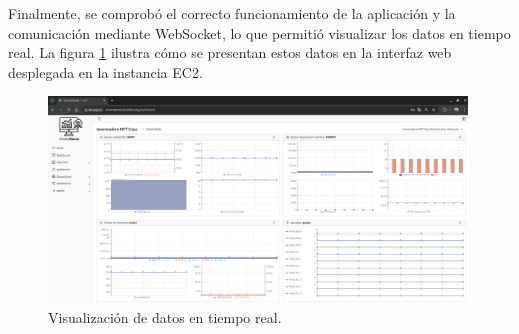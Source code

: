 Finalmente, se comprobó el correcto funcionamiento de la aplicación y la
comunicación mediante WebSocket, lo que permitió visualizar los datos en tiempo
real. La figura \ref{fig:aws-ec2-websocket} ilustra cómo se presentan estos
datos en la interfaz web desplegada en la instancia EC2.

\begin{figure}[H]
    \centering
    \includegraphics[width=0.99\textwidth]{./Images/35-ec2-4.png}
    \caption{Visualización de datos en tiempo real.}
    \label{fig:aws-ec2-websocket}
\end{figure}

